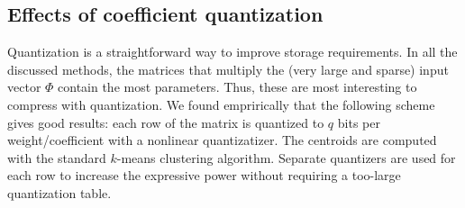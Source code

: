 \documentclass{article}
\begin{document}
	\subsection{Effects of coefficient quantization}
		Quantization is a straightforward way to improve storage requirements.
		In all the discussed methods, the matrices that multiply the (very large and sparse) input vector $\Phi$ contain the most parameters.
		Thus, these are most interesting to compress with quantization.
		We found emprirically that the following scheme gives good results:
		each row of the matrix is quantized to $q$ bits per weight/coefficient with a nonlinear quantizatizer.
		The centroids are computed with the standard $k$-means clustering algorithm.
		Separate quantizers are used for each row to increase the expressive power without requiring a too-large quantization table.
\end{document}
